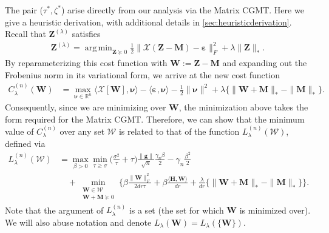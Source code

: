\documentclass[10pt]{article}
\DeclareMathOperator*{\argmin}{arg\,min}
\newcommand{\eps}{\ensuremath{\varepsilon}}
\newcommand{\s}{^*}
\theoremstyle{definition}
\begin{document}
The pair ($\tau\s,\zeta\s$) arise directly from our analysis via the Matrix CGMT.  Here we give a heuristic derivation, with additional details in \cref{sec:heuristicderivation}.  Recall that $\bm{Z}^{(\lambda)}$ satisfies
\begin{align}
 \bm{Z}^{(\lambda)} =    \argmin_{\bm{Z}\succcurlyeq0} \frac{1}{2} \| \mathcal{X}(\bm{Z - M}) - \bm{\eps} \|_F^2 + \lambda \| \bm{Z} \|_*.
\end{align}
By reparameterizing this cost function with $\bm{W} := \bm{Z} - \bm{M}$ and expanding out the Frobenius norm in its variational form, we arrive at the new cost function
\begin{align}
    C_{\lambda}^{(n)}(\bm{W}) &=  \max_{\bm{\nu} \in \mathbb{R}^{n}} \langle \mathcal{X}[\bm{W}], \bm{\nu} \rangle - \langle \bm{\eps} , \bm{\nu} \rangle - \frac{1}{2} \| \bm{\nu} \|^2 + \lambda \big\{ \| \bm{W+M} \|_{*} - \|\bm{M}\|_{*}\big\}.
\end{align}
Consequently, since we are minimizing over $\bm{W}$, the minimization above takes the form required for the Matrix CGMT.  Therefore, 
we can show that the minimum value of $C_{\lambda}^{(n)}$ over any set $\mathcal{W}$ is related to that of the function $L_{\lambda}^{(n)}(\mathcal{W})$, defined via
\begin{subequations}
\label{l_lambda_n}    
\begin{align}
    L_{\lambda}^{(n)}(\mathcal{W}) &= \max_{\beta > 0} \min_{\tau \geq \sigma} \bigg( \frac{\sigma^2}{\tau} + \tau \bigg) \frac{\|\bm{g}\|}{\sqrt{n}}\frac{\gamma_n \beta}{2} - \gamma_n \frac{\beta^2}{2} \\
    &\quad + \min_{ \substack{\bm{W} \in\mathcal{W}\\\bm{W} + \bm{M} \succcurlyeq 0}} \bigg\{  \beta \frac{\|\bm{W}\|_F^2}{2 dr \tau} + \beta \frac{\langle \bm{H}, \bm{W} \rangle}{dr} + \frac{\lambda}{dr} \big\{ \| \bm{W} + \bm{M} \|_* - \|\bm{M} \|_* \big\} \bigg\}.
\end{align}
\end{subequations}
Note that the argument of $L_{\lambda}^{(n)}$ is a set (the set for which $\bm{W}$ is minimized over).  We will also abuse notation and denote $L_{\lambda}(\bm{W}) = L_{\lambda}(\{\bm{W}\})$.  
\end{document}
